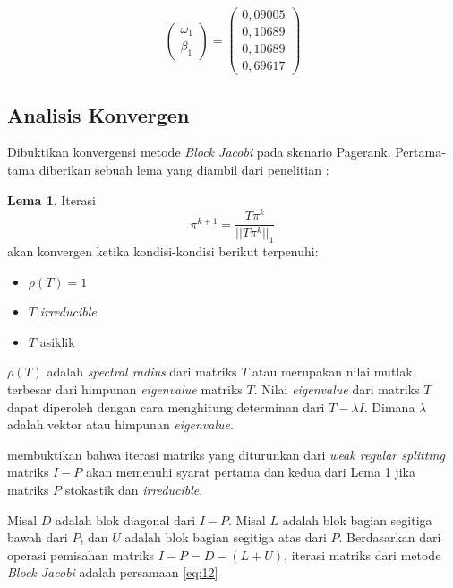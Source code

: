 \begin{equation}
\label{eq:extended_local_pagerank_vector_example}
	\begin{pmatrix}
		\omega_1 \\
		\beta_1
	\end{pmatrix}
	=
	\begin{pmatrix}
		0,09005 \\
		0,10689 \\
		0,10689 \\
		0,69617
	\end{pmatrix}
\end{equation}

\subsection{Analisis Konvergen}

Dibuktikan konvergensi metode \textit{Block Jacobi} pada skenario Pagerank. Pertama-tama diberikan sebuah lema yang diambil dari penelitian \citet{courtoisSemal1986} \citep{zhuetal2005distributedPagerank}:

\textbf{Lema 1}. Iterasi
\begin{equation}
	\label{eq:11}
	\pi^{k+1} = \frac{T\pi^k}{||T\pi^k||_1}
\end{equation}  
akan konvergen ketika kondisi-kondisi berikut terpenuhi:
\begin{itemize}
	\item $\rho(T) = 1$
	\item $T$ \textit{irreducible}
	\item $T$ asiklik
\end{itemize}

$\rho(T)$ adalah \textit{spectral radius} dari matriks $T$ atau merupakan nilai mutlak terbesar dari himpunan \textit{eigenvalue} matriks $T$. Nilai \textit{eigenvalue} dari matriks $T$ dapat diperoleh dengan cara menghitung determinan dari $T - \lambda I$. Dimana $\lambda$ adalah vektor atau himpunan \textit{eigenvalue}.

\citet{neumannPlemmons1978} membuktikan bahwa iterasi matriks yang diturunkan dari \textit{weak regular splitting} matriks $I - P$ akan memenuhi syarat pertama dan kedua dari Lema 1 jika matriks $P$ stokastik dan \textit{irreducible}.

Misal $D$ adalah blok diagonal dari $I - P$. Misal $L$ adalah blok bagian segitiga bawah dari $P$, dan $U$ adalah blok bagian segitiga atas dari $P$. Berdasarkan dari operasi pemisahan matriks $I - P = D - (L + U)$, iterasi matriks dari metode \textit{Block Jacobi} adalah persamaan \ref{eq:12}

